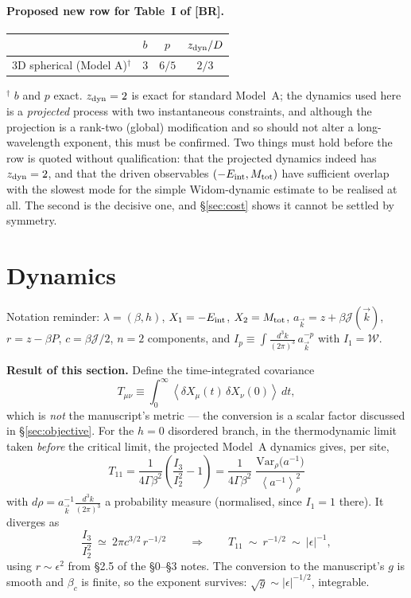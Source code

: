 \documentclass[11pt,a4paper]{article}
\newcommand{\Jc}{\mathcal{J}}
\newcommand{\bk}{\vec k}
\newcommand{\dk}{\frac{d^3k}{(2\pi)^3}}
\newcommand{\avg}[1]{\left\langle #1 \right\rangle}
\newcommand{\Wc}{\mathcal{W}}
\newcommand{\Jc}{\mathcal{J}}
\newcommand{\Tm}{T}
\newcommand{\bk}{\vec k}
\newcommand{\dk}{\frac{d^3k}{(2\pi)^3}}
\newcommand{\avg}[1]{\left\langle #1 \right\rangle}
\newcommand{\Wc}{\mathcal{W}}
\begin{document}
\paragraph{Proposed new row for Table~I of [BR].}
\begin{center}
\begin{tabular}{lccc}
\hline
 & $b$ & $p$ & $z_{\rm dyn}/D$ \\
\hline
3D spherical (Model A)$^{\dagger}$ & $3$ & $6/5$ & $2/3$ \\
\hline
\end{tabular}
\end{center}
$^{\dagger}$ $b$ and $p$ exact. $z_{\rm dyn}=2$ is exact for standard Model~A; the dynamics
used here is a \emph{projected} process with two instantaneous constraints, and although the
projection is a rank-two (global) modification and so should not alter a long-wavelength
exponent, this must be confirmed. Two things must hold before the row is quoted without
qualification: that the projected dynamics indeed has $z_{\rm dyn}=2$, and that the driven
observables $(-E_{\rm int},M_{\rm tot})$ have sufficient overlap with the slowest mode for
the simple Widom-dynamic estimate to be realised at all. The second is the decisive one, and
\S\ref{sec:cost} shows it cannot be settled by symmetry.






\section{Dynamics}
\noindent
Notation reminder: $\lambda=(\beta,h)$, $X_1=-E_{\rm int}$,
$X_2=M_{\rm tot}$, $a_{\bk}=z+\beta\Jc(\bk)$, $r=z-\beta P$, $c=\beta\Jc/2$, $n=2$
components, and $I_p\equiv\int\!\dk\,a_{\bk}^{-p}$ with $I_1=\Wc$.

\medskip
\noindent
\textbf{Result of this section.} Define the time-integrated covariance
\begin{equation}
  \Tm_{\mu\nu}\equiv\int_0^\infty\!\avg{\delta X_\mu(t)\,\delta X_\nu(0)}\,dt ,
  \label{eq:Tdef}
\end{equation}
which is \emph{not} the manuscript's metric --- the conversion is a scalar factor discussed
in \S\ref{sec:objective}. For the $h=0$ disordered branch, in the thermodynamic limit taken
\emph{before} the critical limit, the projected Model~A dynamics gives, per site,
\begin{equation}
  \boxed{\ \Tm_{11}=\frac{1}{4\Gamma\beta^{2}}\left(\frac{I_3}{I_2^{2}}-1\right)
   =\frac{1}{4\Gamma\beta^{2}}\;
    \frac{\mathrm{Var}_\rho\!\big(a^{-1}\big)}{\avg{a^{-1}}_\rho^{2}}\ }
  \label{eq:T11}
\end{equation}
with $d\rho=a_{\bk}^{-1}\dk$ a probability measure (normalised, since $I_1=1$ there). It
diverges as
\begin{equation}
  \frac{I_3}{I_2^2}\ \simeq\ 2\pi c^{3/2}\,r^{-1/2}
  \qquad\Longrightarrow\qquad
  \Tm_{11}\ \sim\ r^{-1/2}\ \sim\ |\epsilon|^{-1} ,
\end{equation}
using $r\sim\epsilon^2$ from \S2.5 of the \S0--\S3 notes. The conversion to the manuscript's
$g$ is smooth and $\beta_c$ is finite, so the exponent survives:
$\sqrt g\sim|\epsilon|^{-1/2}$, integrable.
\end{document}
